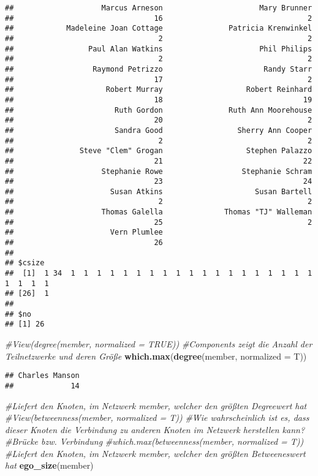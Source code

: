\documentclass[
]{article}
\newenvironment{Shaded}{\begin{snugshade}}{\end{snugshade}}
\newcommand{\CommentTok}[1]{\textcolor[rgb]{0.56,0.35,0.01}{\textit{#1}}}
\newcommand{\DataTypeTok}[1]{\textcolor[rgb]{0.13,0.29,0.53}{#1}}
\newcommand{\KeywordTok}[1]{\textcolor[rgb]{0.13,0.29,0.53}{\textbf{#1}}}
\newcommand{\NormalTok}[1]{#1}
\begin{document}
\begin{verbatim}
##                    Marcus Arneson                      Mary Brunner 
##                                16                                 2 
##            Madeleine Joan Cottage               Patricia Krenwinkel 
##                                 2                                 2 
##                 Paul Alan Watkins                      Phil Philips 
##                                 2                                 2 
##                  Raymond Petrizzo                       Randy Starr 
##                                17                                 2 
##                     Robert Murray                   Robert Reinhard 
##                                18                                19 
##                       Ruth Gordon               Ruth Ann Moorehouse 
##                                20                                 2 
##                       Sandra Good                 Sherry Ann Cooper 
##                                 2                                 2 
##               Steve "Clem" Grogan                   Stephen Palazzo 
##                                21                                22 
##                    Stephanie Rowe                  Stephanie Schram 
##                                23                                24 
##                      Susan Atkins                     Susan Bartell 
##                                 2                                 2 
##                    Thomas Galella              Thomas "TJ" Walleman 
##                                25                                 2 
##                      Vern Plumlee 
##                                26 
## 
## $csize
##  [1]  1 34  1  1  1  1  1  1  1  1  1  1  1  1  1  1  1  1  1  1  1  1  1  1  1
## [26]  1
## 
## $no
## [1] 26
\end{verbatim}

\begin{Shaded}
\begin{Highlighting}[]
\CommentTok{#View(degree(member, normalized = TRUE))}
\CommentTok{#Components zeigt die Anzahl der Teilnetzwerke und deren Größe}
\KeywordTok{which.max}\NormalTok{(}\KeywordTok{degree}\NormalTok{(member, }\DataTypeTok{normalized =}\NormalTok{ T))}
\end{Highlighting}
\end{Shaded}

\begin{verbatim}
## Charles Manson 
##             14
\end{verbatim}

\begin{Shaded}
\begin{Highlighting}[]
\CommentTok{#Liefert den Knoten, im Netzwerk member, welcher den größten Degreewert hat}
\CommentTok{#View(betweenness(member, normalized = T))}
\CommentTok{#Wie wahrscheinlich ist es, dass dieser Knoten die Verbindung zu anderen Knoten im Netzwerk herstellen kann?}
\CommentTok{#Brücke bzw. Verbindung}
\CommentTok{#which.max(betweenness(member, normalized = T))}
\CommentTok{#Liefert den Knoten, im Netzwerk member, welcher den größten Betweeneswert hat}
\KeywordTok{ego_size}\NormalTok{(member)}
\end{Highlighting}
\end{Shaded}
\end{document}
